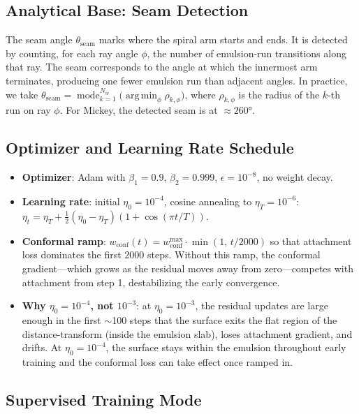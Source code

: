 \documentclass[11pt,a4paper]{article}
\begin{document}
\subsection{Analytical Base: Seam Detection}

The seam angle $\theta_{\text{seam}}$ marks where the spiral arm starts and ends. It is detected by counting, for each ray angle $\phi$, the number of emulsion-run transitions along that ray. The seam corresponds to the angle at which the innermost arm terminates, producing one fewer emulsion run than adjacent angles. In practice, we take $\theta_{\text{seam}} = \operatorname{mode}_{k=1}^{N_w}\bigl(\operatorname{arg\,min}_\phi \rho_{k,\phi}\bigr)$, where $\rho_{k,\phi}$ is the radius of the $k$-th run on ray $\phi$. For Mickey, the detected seam is at $\approx 260°$.

\subsection{Optimizer and Learning Rate Schedule}

\begin{itemize}
    \item \textbf{Optimizer}: Adam with $\beta_1 = 0.9$, $\beta_2 = 0.999$, $\epsilon = 10^{-8}$, no weight decay.
    \item \textbf{Learning rate}: initial $\eta_0 = 10^{-4}$, cosine annealing to $\eta_T = 10^{-6}$: $\eta_t = \eta_T + \frac{1}{2}(\eta_0 - \eta_T)(1 + \cos(\pi t / T))$.
    \item \textbf{Conformal ramp}: $w_{\text{conf}}(t) = w_{\text{conf}}^{\max} \cdot \min(1,\, t / 2000)$ so that attachment loss dominates the first 2000 steps. Without this ramp, the conformal gradient—which grows as the residual moves away from zero—competes with attachment from step 1, destabilizing the early convergence.
    \item \textbf{Why $\eta_0 = 10^{-4}$, not $10^{-3}$}: at $\eta_0 = 10^{-3}$, the residual updates are large enough in the first $\sim$100 steps that the surface exits the flat region of the distance-transform (inside the emulsion slab), loses attachment gradient, and drifts. At $\eta_0 = 10^{-4}$, the surface stays within the emulsion throughout early training and the conformal loss can take effect once ramped in.
\end{itemize}

\subsection{Supervised Training Mode}
\end{document}
